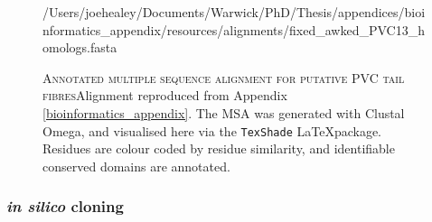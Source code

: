 \begin{figure}[p]
\vspace{-0.5cm}
\begin{texshade}{/Users/joehealey/Documents/Warwick/PhD/Thesis/appendices/bioinformatics_appendix/resources/alignments/fixed_awked_PVC13_homologs.fasta}

\smallblockskip
\hideruler
\vsepspace{0.2pt}
\hideconsensus
\topspace{-3pt}
\featuressmall
{}
%
%
\end{texshade}
	\captionsetup{singlelinecheck=off, justification=justified, font=footnotesize, aboveskip=5pt}
	\caption[Multiple Sequence Alignment of PVC Tail fibres]{\textsc{\normalsize Annotated multiple sequence alignment for putative PVC tail fibres}\vspace{0.1cm}\newline Alignment reproduced from Appendix \vref{bioinformatics_appendix}. The MSA was generated with Clustal Omega, and visualised here via the \texttt{TexShade} \LaTeX package. Residues are colour coded by residue similarity, and identifiable conserved domains are annotated.}
	\label{tailfibremsa}
\end{figure}
\clearpage



\subsubsection{\emph{in silico} cloning}

